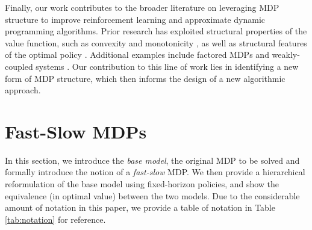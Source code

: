 \documentclass[11pt, notitlepage]{article}
\newcommand{\1}{\mathbbm{1}}
\begin{document}
Finally, our work contributes to the broader literature on leveraging MDP structure to improve reinforcement learning and approximate dynamic programming algorithms. Prior research has exploited structural properties of the value function, such as convexity \citep{pereira1991multi,philpott2008convergence,nascimento2009optimal,benjaafar2022dynamic} and monotonicity \citep{papadaki2002exploiting,jiang2015approximate}, as well as structural features of the optimal policy \citep{kunnumkal2008using}. Additional examples include factored MDPs \citep{osband2014near} and weakly-coupled systems \citep{killian2021q,el2023weakly,brown2025unit,nadarajah2025self}. Our contribution to this line of work lies in identifying a new form of MDP structure, which then informs the design of a new algorithmic approach.















\section{Fast-Slow MDPs} \label{sec:GeneralModel}
In this section, we introduce the \emph{base model}, the original MDP to be solved and formally introduce the notion of a \emph{fast-slow} MDP. We then provide a hierarchical reformulation of the base model using fixed-horizon policies, and show the equivalence (in optimal value) between the two models.
Due to the considerable amount of notation in this paper, we provide a table of notation in Table \ref{tab:notation} for reference.
\end{document}
